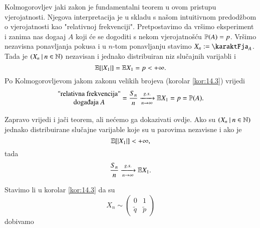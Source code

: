 \begin{nap} \label{nap:14.4}
    Kolmogorovljev jaki zakon je fundamentalni teorem u ovom pristupu vjerojatnosti.
    Njegova interpretacija je u skladu s na\v som intuitivnom predod\v zbom o vjerojatnosti kao "relativnoj frekvenciji".
    Pretpostavimo da vr\v simo eksperiment i zanima nas doga\dj aj $A$ koji \' ce se dogoditi s nekom vjerojatno\v s\' cu $\mathbb{P}({A}) = p$.
    Vr\v simo nezavisna ponavljanja pokusa i u $n$-tom ponavljanju stavimo $X_n := \karaktFja_A$.
    Tada je $({X_n} \: | \: {n \in \mathbb{N}})$ nezavisan i jednako distribuiran niz slu\v cajnih varijabli i
    \begin{equation*}
        \mathbb{E} [|X_1|] = \mathbb{E} X_1 = p < + \infty.
    \end{equation*}
    Po Kolmogorovljevom jakom zakonu velikih brojeva (korolar \ref{kor:14.3}) vrijedi
    \begin{equation*}
        \begin{matrix}
            \textnormal{"relativna frekvencija"}\\
            \textnormal{doga\dj aja } A
        \end{matrix}
        = \frac{S_n}{n} \xrightarrow[n \to \infty]{g.s.} \masE X_1 = p = \vjeroj{A}.
    \end{equation*}
\end{nap}

\begin{nap} \label{nap:14.5}
    Zapravo vrijedi i ja\v ci teorem, ali ne\' cemo ga dokazivati ovdje.
    Ako su $({X_n} \: | \: {n \in \mathbb{N}})$ jednako distribuirane slu\v cajne varijable koje su u parovima nezavisne i ako je
    \begin{equation*}
        \mathbb{E} [ |X_1| ] < +\infty,
    \end{equation*}
    tada
    \begin{equation*}
        \frac{S_n}{n} \xrightarrow[n \to \infty]{g.s.} \mathbb{E} X_1.
    \end{equation*}
\end{nap}

Stavimo li u korolar \ref{kor:14.3} da su
\begin{equation*}
    X_n \sim
    \begin{pmatrix}
        0 & 1\\
        \tilde{q} & \tilde{p}
    \end{pmatrix}
\end{equation*}
dobivamo

